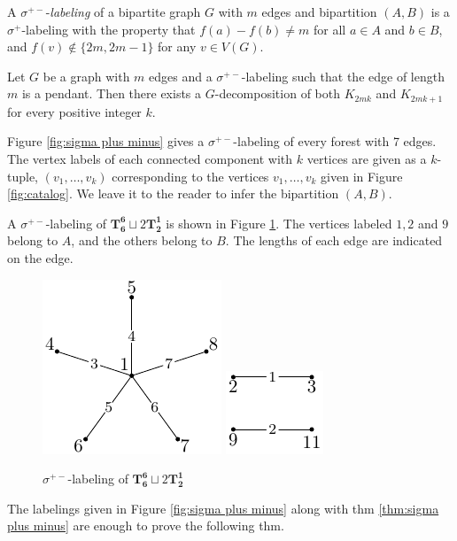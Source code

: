 \begin{definition} \label{def:sigma plus minus} 
A $\sigma^{+-}$-\emph{labeling} of a bipartite graph $G$ with $m$ edges and bipartition $(A,B)$ is a $\sigma^+$-labeling with the property that $f(a) - f(b) \neq m$ for all $a \in A$ and $b \in B$, and $f(v) \not\in \{2m,2m-1\}$ for any $v\in V(G)$.
\end{definition}

\begin{thm} \label{thm:sigma plus minus}
Let $G$ be a graph with $m$ edges and a $\sigma^{+-}$-labeling such that the edge of length $m$ is a pendant. Then there exists a $G$-decomposition of both $K_{2mk}$ and $K_{2mk+1}$ for every positive integer $k$.
\end{thm}

Figure \ref{fig:sigma plus minus} gives a $\sigma^{+-}$-labeling of every forest with 7 edges. The vertex labels of each connected component with $k$ vertices are given as a $k$-tuple, $(v_1,\dots ,v_k)$ corresponding to the vertices $v_1, \dots, v_k$ given in Figure \ref{fig:catalog}. We leave it to the reader to infer the bipartition $(A,B)$. 
\begin{example}
    A $\sigma^{+-}$-labeling of $\mathbf{T_{6}^{6}}\sqcup 2\mathbf{T_{2}^{1}}$ is shown in Figure \ref{fig:sigma label ex}. The vertices labeled $1,2$ and $9$ belong to $A$, and the others belong to $B$. The lengths of each edge are indicated on the edge.
    \begin{figure}[H]
        \centering
        \includegraphics[scale=1.0]{standalone/sigma label ex1.pdf}
         \includegraphics[scale=1.0]{standalone/sigma label ex2.pdf}
        \caption{$\sigma^{+-}$-labeling of $\mathbf{T_{6}^{6}}\sqcup 2\mathbf{T_{2}^{1}}$}
        \label{fig:sigma label ex}
    \end{figure}
\end{example}
 The labelings given in Figure \ref{fig:sigma plus minus} along with thm \ref{thm:sigma plus minus} are enough to prove the following thm. \newpage 

